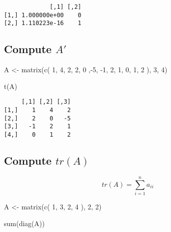 \documentclass[
  letterpaper,
  DIV=11,
  numbers=noendperiod]{scrartcl}
\newenvironment{Shaded}{\begin{snugshade}}{\end{snugshade}}
\newcommand{\DecValTok}[1]{\textcolor[rgb]{0.68,0.00,0.00}{#1}}
\newcommand{\FunctionTok}[1]{\textcolor[rgb]{0.28,0.35,0.67}{#1}}
\newcommand{\NormalTok}[1]{\textcolor[rgb]{0.00,0.23,0.31}{#1}}
\newcommand{\OtherTok}[1]{\textcolor[rgb]{0.00,0.23,0.31}{#1}}
\newcommand{\SpecialCharTok}[1]{\textcolor[rgb]{0.37,0.37,0.37}{#1}}
\begin{document}
\begin{verbatim}
             [,1] [,2]
[1,] 1.000000e+00    0
[2,] 1.110223e-16    1
\end{verbatim}

\hypertarget{compute-a}{%
\subsection{\texorpdfstring{Compute
\(A'\)}{Compute A\textquotesingle{}}}\label{compute-a}}

\begin{Shaded}
\begin{Highlighting}[]
\NormalTok{A }\OtherTok{\textless{}{-}} \FunctionTok{matrix}\NormalTok{(}\FunctionTok{c}\NormalTok{(}
  \DecValTok{1}\NormalTok{, }\DecValTok{4}\NormalTok{, }\DecValTok{2}\NormalTok{,}
  \DecValTok{2}\NormalTok{, }\DecValTok{0}\NormalTok{ ,}\SpecialCharTok{{-}}\DecValTok{5}\NormalTok{,}
  \SpecialCharTok{{-}}\DecValTok{1}\NormalTok{, }\DecValTok{2}\NormalTok{, }\DecValTok{1}\NormalTok{,}
  \DecValTok{0}\NormalTok{, }\DecValTok{1}\NormalTok{, }\DecValTok{2}
\NormalTok{), }\DecValTok{3}\NormalTok{, }\DecValTok{4}\NormalTok{)}

\FunctionTok{t}\NormalTok{(A)}
\end{Highlighting}
\end{Shaded}

\begin{verbatim}
     [,1] [,2] [,3]
[1,]    1    4    2
[2,]    2    0   -5
[3,]   -1    2    1
[4,]    0    1    2
\end{verbatim}

\hypertarget{compute-tra}{%
\subsection{\texorpdfstring{Compute
\(tr(A)\)}{Compute tr(A)}}\label{compute-tra}}

\[
tr(A)=\sum_{i=1}^n a_{ii}
\]

\begin{Shaded}
\begin{Highlighting}[]
\NormalTok{A }\OtherTok{\textless{}{-}} \FunctionTok{matrix}\NormalTok{(}\FunctionTok{c}\NormalTok{(}
  \DecValTok{1}\NormalTok{, }\DecValTok{3}\NormalTok{,}
  \DecValTok{2}\NormalTok{, }\DecValTok{4}
\NormalTok{), }\DecValTok{2}\NormalTok{, }\DecValTok{2}\NormalTok{) }

\FunctionTok{sum}\NormalTok{(}\FunctionTok{diag}\NormalTok{(A))}
\end{Highlighting}
\end{Shaded}
\end{document}
